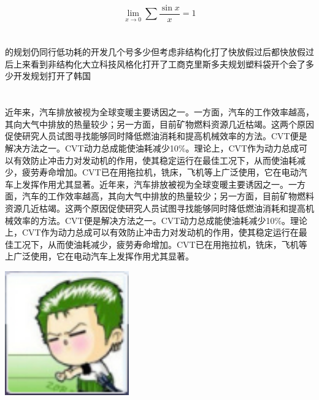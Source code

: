 \documentclass[a4paper,11pt]{article}
\newcommand{\wuhao}{\fontsize{10.5pt}{10.5pt}\selectfont} %
\begin{document}
\[\lim_{x \to 0}\sum
\frac{\sin x}{x}=1\]

\begin{multicols}{2}
\section{}
\song\wuhao 的规划仍同行低功耗的开发几个号多少但考虑非结构化打了快放假过后都快放假过后上来看到非结构化大立科技风格化打开了工商克里斯多夫规划塑料袋开个会了多少开发规划打开了韩国
%
\section{}
\song\wuhao 近年来，汽车排放被视为全球变暖主要诱因之一。一方面，汽车的工作效率越高，其向大气中排放的热量较少；另一方面，目前矿物燃料资源几近枯竭。这两个原因促使研究人员试图寻找能够同时降低燃油消耗和提高机械效率的方法。CVT便是解决方法之一。CVT动力总成能使油耗减少10\%。理论上，CVT作为动力总成可以有效防止冲击力对发动机的作用，使其稳定运行在最佳工况下，从而使油耗减少，疲劳寿命增加。CVT已在用拖拉机，铣床，飞机等上广泛使用，它在电动汽车上发挥作用尤其显著。近年来，汽车排放被视为全球变暖主要诱因之一。一方面，汽车的工作效率越高，其向大气中排放的热量较少；另一方面，目前矿物燃料资源几近枯竭。这两个原因促使研究人员试图寻找能够同时降低燃油消耗和提高机械效率的方法。CVT便是解决方法之一。CVT动力总成能使油耗减少10\%。理论上，CVT作为动力总成可以有效防止冲击力对发动机的作用，使其稳定运行在最佳工况下，从而使油耗减少，疲劳寿命增加。CVT已在用拖拉机，铣床，飞机等上广泛使用，它在电动汽车上发挥作用尤其显著。
\begin{center}
  \includegraphics[width=0.4\textwidth]{tupianceshi.jpg}
\end{center}
\end{multicols}
\end{document}
